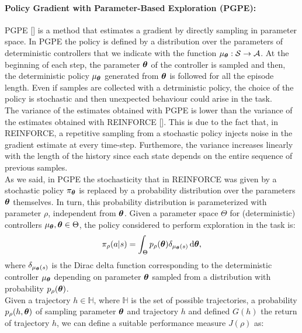 \paragraph{Policy Gradient with Parameter-Based Exploration (PGPE):} \label{subsec:pgpe}
\ac{PGPE} [\cite{sehnke2008policy}] is a method that estimates a gradient by directly sampling in parameter space. In \ac{PGPE} the policy is defined by a distribution over the parameters of deterministic controllers that we indicate with the function $\mu_{\boldsymbol{\theta}}: \mathcal{S} \to \mathcal{A}$. At the beginning of each step, the parameter $\boldsymbol{\theta}$ of the controller is sampled and then, the deterministic policy $\mu_{\boldsymbol{\theta}}$ generated from $\boldsymbol{\theta}$ is followed for all the episode length. Even if samples are collected with a detrministic policy, the choice of the policy is stochastic and then unexpected behaviour could arise in the task.\\
\newline
The variance of the estimates obtained with \ac{PGPE} is lower than the variance of the estimates obtained with REINFORCE [\cite{zhao2013efficient}]. This is due to the fact that, in REINFORCE, a repetitive sampling from a stochastic policy injects noise in the gradient estimate at every time-step. Furthemore, the variance increases linearly with the length of the history since each state depends on the entire sequence of previous samples.\\
\newline
As we said, in \ac{PGPE} the stochasticity that in REINFORCE was given by a stochastic policy $\pi_{\boldsymbol{\theta}}$ is replaced by a probability distribution over the parameters $\boldsymbol{\theta}$ themselves. In turn, this probability distribution is parameterized with parameter $\rho$, independent from $\boldsymbol{\theta}$. Given a parameter space $\Theta$ for (deterministic) controllers $\mu_{\boldsymbol{\theta}}, \boldsymbol{\theta} \in \Theta$, the policy considered to perform exploration in the task is:
\begin{align}
\pi_{\rho}(a|s) = \int_{\Theta} p_{\rho}(\boldsymbol{\theta}) \delta_{\mu_{\boldsymbol{\theta}}(s)}\,\mathrm{d} \boldsymbol{\theta},
\end{align}
where $\delta_{\mu_{\boldsymbol{\theta}}(s)}$ is the Dirac delta function corresponding to the deterministic controller $\mu_{\boldsymbol{\theta}}$ depending on parameter $\boldsymbol{\theta}$ sampled from a distribution with probability $p_{\rho}(\boldsymbol{\theta})$.\\
\newline
Given a trajectory $h \in \mathbb{H}$, where $\mathbb{H}$ is the set of possible trajectories, a probability $p_{\rho}(h, \boldsymbol{\theta})$ of sampling parameter $\boldsymbol{\theta}$ and trajectory $h$ and defined $G(h)$ the return of trajectory $h$, we can define a suitable performance measure $J(\rho)$ as:
